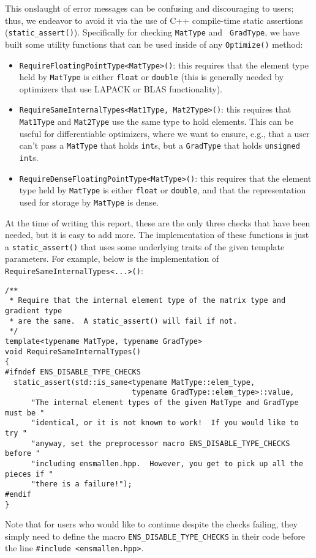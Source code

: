 This onslaught of error messages can be confusing and discouraging to users;
thus, we endeavor to avoid it via the use of C++ compile-time static assertions
({\tt static\_assert()}).  Specifically for checking {\tt MatType} and {\tt
GradType}, we have built some utility functions that can be used inside of any
{\tt Optimize()} method:

\begin{itemize}
  \item {\tt RequireFloatingPointType<MatType>()}: this requires that the
element type held by {\tt MatType} is either {\tt float} or {\tt double} (this
is generally needed by optimizers that use LAPACK or BLAS functionality).

  \item {\tt RequireSameInternalTypes<Mat1Type, Mat2Type>()}: this requires that
{\tt Mat1Type} and {\tt Mat2Type} use the same type to hold elements.  This can
be useful for differentiable optimizers, where we want to ensure, e.g., that a
user can't pass a {\tt MatType} that holds {\tt int}s, but a {\tt GradType} that
holds {\tt unsigned int}s.

  \item {\tt RequireDenseFloatingPointType<MatType>()}: this requires that the
element type held by {\tt MatType} is either {\tt float} or {\tt double}, and
that the representation used for storage by {\tt MatType} is dense.
\end{itemize}

At the time of writing this report, these are the only three checks that have
been needed, but it is easy to add more.  The implementation of these functions
is just a {\tt static\_assert()} that uses some underlying traits of the given
template parameters.  For example, below is the implementation of {\tt
RequireSameInternalTypes<...>()}:

\begin{verbatim}
/**
 * Require that the internal element type of the matrix type and gradient type
 * are the same.  A static_assert() will fail if not.
 */
template<typename MatType, typename GradType>
void RequireSameInternalTypes()
{
#ifndef ENS_DISABLE_TYPE_CHECKS
  static_assert(std::is_same<typename MatType::elem_type,
                             typename GradType::elem_type>::value,
      "The internal element types of the given MatType and GradType must be "
      "identical, or it is not known to work!  If you would like to try "
      "anyway, set the preprocessor macro ENS_DISABLE_TYPE_CHECKS before "
      "including ensmallen.hpp.  However, you get to pick up all the pieces if "
      "there is a failure!");
#endif
}
\end{verbatim}

Note that for users who would like to continue despite the checks failing, they
simply need to define the macro {\tt ENS\_DISABLE\_TYPE\_CHECKS} in their code
before the line {\tt \#include <ensmallen.hpp>}.
